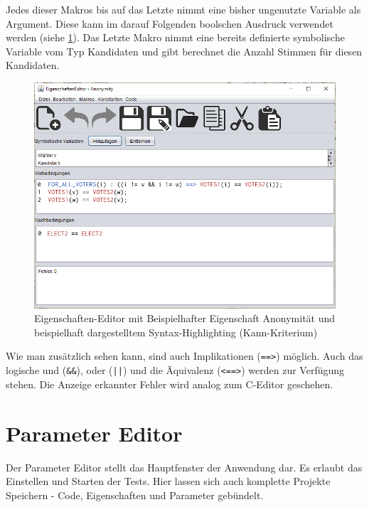\documentclass[a4paper]{scrreprt}
\begin{document}
Jedes dieser Makros bis auf das Letzte nimmt eine bisher ungenutzte Variable als Argument. Diese kann im darauf Folgenden boolschen Ausdruck verwendet werden (siehe \ref{Eigenschaften-Editor-Anonymität}). Das Letzte Makro nimmt eine bereits definierte symbolische Variable vom Typ Kandidaten und gibt berechnet die Anzahl Stimmen für diesen Kandidaten.

\begin{figure}[H]
\includegraphics[scale=0.5]{Editor-vor-und-nachbedingungen-syntax-highlighting.png}
\caption{Eigenschaften-Editor mit Beispielhafter Eigenschaft Anonymität und beispielhaft dargestelltem Syntax-Highlighting (Kann-Kriterium)}
\label{Eigenschaften-Editor-Anonymität}
\end{figure}

Wie man zusätzlich sehen kann, sind auch Implikationen (\verb!==>!) möglich. Auch das logische und (\verb!&&!), oder (\verb!||!) und die Äquivalenz (\verb!<==>!) werden zur Verfügung stehen. Die Anzeige erkannter Fehler wird analog zum C-Editor geschehen.

\section{Parameter Editor}

Der Parameter Editor stellt das Hauptfenster der Anwendung dar. Es erlaubt das Einstellen und Starten der Tests. Hier lassen sich auch komplette Projekte Speichern - Code, Eigenschaften und Parameter gebündelt.
\end{document}
